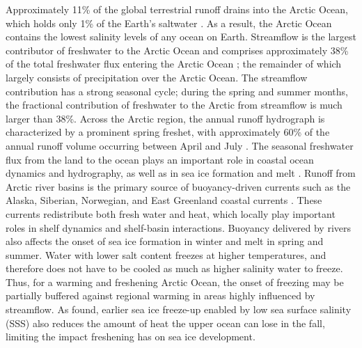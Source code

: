 \documentclass[jgrga, draft]{agutex}
\begin{document}
\begin{article}
Approximately 11\% of the global terrestrial runoff drains into the Arctic Ocean, which holds only 1\% of the Earth's saltwater \citep{Lewis_2000,Lammers_2001}.
As a result, the Arctic Ocean contains the lowest salinity levels of any ocean on Earth.
Streamflow is the largest contributor of freshwater to the Arctic Ocean and comprises approximately 38\% of the total freshwater flux entering the Arctic Ocean \citep{Serreze_2006}; the remainder of which largely consists of precipitation over the Arctic Ocean.
The streamflow contribution has a strong seasonal cycle; during the spring and summer months, the fractional contribution of freshwater to the Arctic from streamflow is much larger than 38\%.
Across the Arctic region, the annual runoff hydrograph is characterized by a prominent spring freshet, with approximately 60\% of the annual runoff volume occurring between April and July \citep{Lammers_2001}.
The seasonal freshwater flux from the land to the ocean plays an important role in coastal ocean dynamics and hydrography, as well as in sea ice formation and melt \citep{Rabe_2011,Fichot_2013}.
Runoff from Arctic river basins is the primary source of buoyancy-driven currents such as the Alaska, Siberian, Norwegian, and East Greenland coastal currents \citep[e.g.][]{Morison_2000,Boyd_2002,McGeehan_2012}.
These currents redistribute both fresh water and heat, which locally play important roles in shelf dynamics and shelf-basin interactions.
Buoyancy delivered by rivers also affects the onset of sea ice formation in winter and melt in spring and summer.
Water with lower salt content freezes at higher temperatures, and therefore does not have to be cooled as much as higher salinity water to freeze.
Thus, for a warming and freshening Arctic Ocean, the onset of freezing may be partially buffered against regional warming in areas highly influenced by streamflow.
As \citet{Morison_2012} found, earlier sea ice freeze-up enabled by low sea surface salinity (SSS) also reduces the amount of heat the upper ocean can lose in the fall, limiting the impact freshening has on sea ice development.


\end{article}
\end{document}
